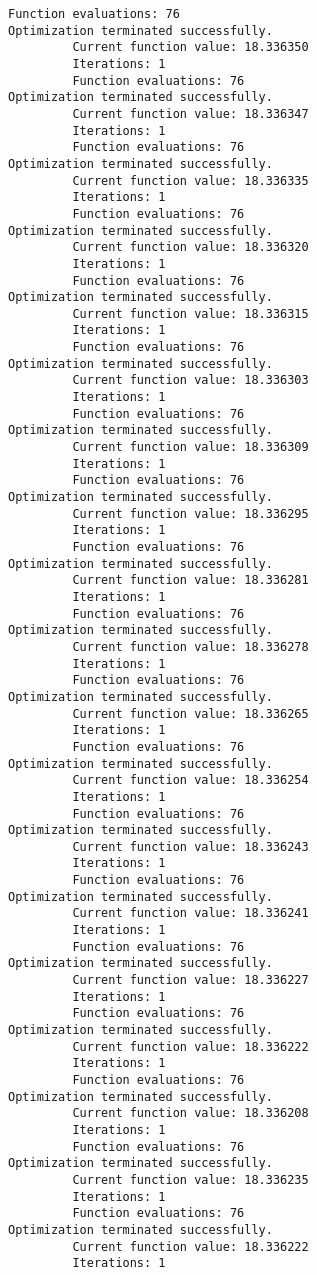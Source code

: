\documentclass[11pt]{article}
\begin{document}
\begin{Verbatim}[commandchars=\\\{\}]
         Function evaluations: 76
Optimization terminated successfully.
         Current function value: 18.336350
         Iterations: 1
         Function evaluations: 76
Optimization terminated successfully.
         Current function value: 18.336347
         Iterations: 1
         Function evaluations: 76
Optimization terminated successfully.
         Current function value: 18.336335
         Iterations: 1
         Function evaluations: 76
Optimization terminated successfully.
         Current function value: 18.336320
         Iterations: 1
         Function evaluations: 76
Optimization terminated successfully.
         Current function value: 18.336315
         Iterations: 1
         Function evaluations: 76
Optimization terminated successfully.
         Current function value: 18.336303
         Iterations: 1
         Function evaluations: 76
Optimization terminated successfully.
         Current function value: 18.336309
         Iterations: 1
         Function evaluations: 76
Optimization terminated successfully.
         Current function value: 18.336295
         Iterations: 1
         Function evaluations: 76
Optimization terminated successfully.
         Current function value: 18.336281
         Iterations: 1
         Function evaluations: 76
Optimization terminated successfully.
         Current function value: 18.336278
         Iterations: 1
         Function evaluations: 76
Optimization terminated successfully.
         Current function value: 18.336265
         Iterations: 1
         Function evaluations: 76
Optimization terminated successfully.
         Current function value: 18.336254
         Iterations: 1
         Function evaluations: 76
Optimization terminated successfully.
         Current function value: 18.336243
         Iterations: 1
         Function evaluations: 76
Optimization terminated successfully.
         Current function value: 18.336241
         Iterations: 1
         Function evaluations: 76
Optimization terminated successfully.
         Current function value: 18.336227
         Iterations: 1
         Function evaluations: 76
Optimization terminated successfully.
         Current function value: 18.336222
         Iterations: 1
         Function evaluations: 76
Optimization terminated successfully.
         Current function value: 18.336208
         Iterations: 1
         Function evaluations: 76
Optimization terminated successfully.
         Current function value: 18.336235
         Iterations: 1
         Function evaluations: 76
Optimization terminated successfully.
         Current function value: 18.336222
         Iterations: 1

\end{Verbatim}
\end{document}
